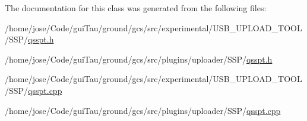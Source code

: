 The documentation for this class was generated from the following files\-:\begin{DoxyCompactItemize}
\item 
/home/jose/\-Code/gui\-Tau/ground/gcs/src/experimental/\-U\-S\-B\-\_\-\-U\-P\-L\-O\-A\-D\-\_\-\-T\-O\-O\-L/\-S\-S\-P/\hyperlink{experimental_2_u_s_b___u_p_l_o_a_d___t_o_o_l_2_s_s_p_2qsspt_8h}{qsspt.\-h}\item 
/home/jose/\-Code/gui\-Tau/ground/gcs/src/plugins/uploader/\-S\-S\-P/\hyperlink{plugins_2uploader_2_s_s_p_2qsspt_8h}{qsspt.\-h}\item 
/home/jose/\-Code/gui\-Tau/ground/gcs/src/experimental/\-U\-S\-B\-\_\-\-U\-P\-L\-O\-A\-D\-\_\-\-T\-O\-O\-L/\-S\-S\-P/\hyperlink{experimental_2_u_s_b___u_p_l_o_a_d___t_o_o_l_2_s_s_p_2qsspt_8cpp}{qsspt.\-cpp}\item 
/home/jose/\-Code/gui\-Tau/ground/gcs/src/plugins/uploader/\-S\-S\-P/\hyperlink{plugins_2uploader_2_s_s_p_2qsspt_8cpp}{qsspt.\-cpp}\end{DoxyCompactItemize}
